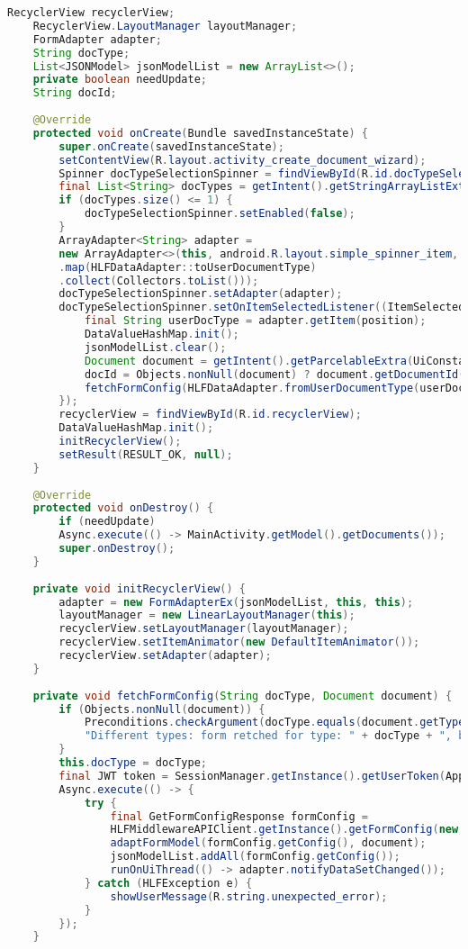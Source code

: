 \begin{lstlisting}[language=Java]
	RecyclerView recyclerView;
	RecyclerView.LayoutManager layoutManager;
	FormAdapter adapter;
	String docType;
	List<JSONModel> jsonModelList = new ArrayList<>();
	private boolean needUpdate;
	String docId;
	
	@Override
	protected void onCreate(Bundle savedInstanceState) {
		super.onCreate(savedInstanceState);
		setContentView(R.layout.activity_create_document_wizard);
		Spinner docTypeSelectionSpinner = findViewById(R.id.docTypeSelectionSpinner);
		final List<String> docTypes = getIntent().getStringArrayListExtra(UiConstants.DOC_TYPES_EXTRA);
		if (docTypes.size() <= 1) {
			docTypeSelectionSpinner.setEnabled(false);
		}
		ArrayAdapter<String> adapter =
		new ArrayAdapter<>(this, android.R.layout.simple_spinner_item, docTypes.stream()
		.map(HLFDataAdapter::toUserDocumentType)
		.collect(Collectors.toList()));
		docTypeSelectionSpinner.setAdapter(adapter);
		docTypeSelectionSpinner.setOnItemSelectedListener((ItemSelectedListener) (parent, itemSelected, position, selectedId) -> {
			final String userDocType = adapter.getItem(position);
			DataValueHashMap.init();
			jsonModelList.clear();
			Document document = getIntent().getParcelableExtra(UiConstants.DOC_TO_EDIT_EXTRA);
			docId = Objects.nonNull(document) ? document.getDocumentId() : null;
			fetchFormConfig(HLFDataAdapter.fromUserDocumentType(userDocType), document);
		});
		recyclerView = findViewById(R.id.recyclerView);
		DataValueHashMap.init();
		initRecyclerView();
		setResult(RESULT_OK, null);
	}
	
	@Override
	protected void onDestroy() {
		if (needUpdate)
		Async.execute(() -> MainActivity.getModel().getDocuments());
		super.onDestroy();
	}
	
	private void initRecyclerView() {
		adapter = new FormAdapterEx(jsonModelList, this, this);
		layoutManager = new LinearLayoutManager(this);
		recyclerView.setLayoutManager(layoutManager);
		recyclerView.setItemAnimator(new DefaultItemAnimator());
		recyclerView.setAdapter(adapter);
	}
	
	private void fetchFormConfig(String docType, Document document) {
		if (Objects.nonNull(document)) {
			Preconditions.checkArgument(docType.equals(document.getType()),
			"Different types: form retched for type: " + docType + ", but doc's actual type: " + document.getStatus());
		}
		this.docType = docType;
		final JWT token = SessionManager.getInstance().getUserToken(ApplicationContext.get()).orElseThrow(IllegalStateException::new);
		Async.execute(() -> {
			try {
				final GetFormConfigResponse formConfig =
				HLFMiddlewareAPIClient.getInstance().getFormConfig(new GetFormConfigRequest(docType), token.toString());
				adaptFormModel(formConfig.getConfig(), document);
				jsonModelList.addAll(formConfig.getConfig());
				runOnUiThread(() -> adapter.notifyDataSetChanged());
			} catch (HLFException e) {
				showUserMessage(R.string.unexpected_error);
			}
		});
	}
	

\end{lstlisting}
